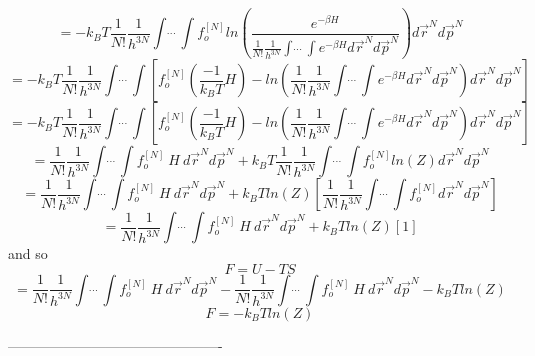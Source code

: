 \documentclass[12pt]{article}
\begin{document}
\begin{equation}  =-k_BT\frac{1}{N!}\frac{1}{h^{3N}}\int\dot~\dot~\dot~\int f_o^{[N]}ln\left(\frac{e^{-\beta H}}{\frac{1}{N!}\frac{1}{h^{3N}}\int\dot~\dot~\dot~\int e^{-\beta H} d\vec r^{N} d\vec p^{N}}\right) d\vec r^{N} d\vec p^{N} \end{equation}
\begin{equation}  =-k_BT\frac{1}{N!}\frac{1}{h^{3N}}\int\dot~\dot~\dot~\int \left[f_o^{[N]}\left(\frac{-1}{k_BT}H\right)-ln\left(\frac{1}{N!}\frac{1}{h^{3N}}\int\dot~\dot~\dot~\int e^{-\beta H} d\vec r^{N} d\vec p^{N}\right) d\vec r^{N} d\vec p^{N}\right] \end{equation}
\begin{equation}  =-k_BT\frac{1}{N!}\frac{1}{h^{3N}}\int\dot~\dot~\dot~\int \left[f_o^{[N]}\left(\frac{-1}{k_BT}H\right)-ln\left(\frac{1}{N!}\frac{1}{h^{3N}}\int\dot~\dot~\dot~\int e^{-\beta H} d\vec r^{N} d\vec p^{N}\right) d\vec r^{N} d\vec p^{N}\right] \end{equation}
\begin{equation} = \frac{1}{N!}\frac{1}{h^{3N}}\int\dot~\dot~\dot~\int f_o^{[N]}~H~d\vec r^{N} d\vec p^{N} +k_BT\frac{1}{N!}\frac{1}{h^{3N}}\int\dot~\dot~\dot~\int f_o^{[N]}ln(Z)d\vec r^{N} d\vec p^{N}\end{equation}
\begin{equation} = \frac{1}{N!}\frac{1}{h^{3N}}\int\dot~\dot~\dot~\int f_o^{[N]}~H~d\vec r^{N} d\vec p^{N} +k_BTln(Z)\left[\frac{1}{N!}\frac{1}{h^{3N}}\int\dot~\dot~\dot~\int f_o^{[N]}d\vec r^{N} d\vec p^{N}\right]\end{equation}
\begin{equation} = \frac{1}{N!}\frac{1}{h^{3N}}\int\dot~\dot~\dot~\int f_o^{[N]}~H~d\vec r^{N} d\vec p^{N} +k_BTln(Z)\left[1\right]\end{equation}
and so 
\begin{equation}F = U - TS\end{equation}
\begin{equation} = \frac{1}{N!}\frac{1}{h^{3N}}\int\dot~\dot~\dot~\int f_o^{[N]}~H~d\vec r^{N} d\vec p^{N}-\frac{1}{N!}\frac{1}{h^{3N}}\int\dot~\dot~\dot~\int f_o^{[N]}~H~d\vec r^{N} d\vec p^{N} -k_BTln(Z)\end{equation}
\begin{equation}F = -k_BTln(Z)\end{equation}

----------------------------------------------


\end{document}
